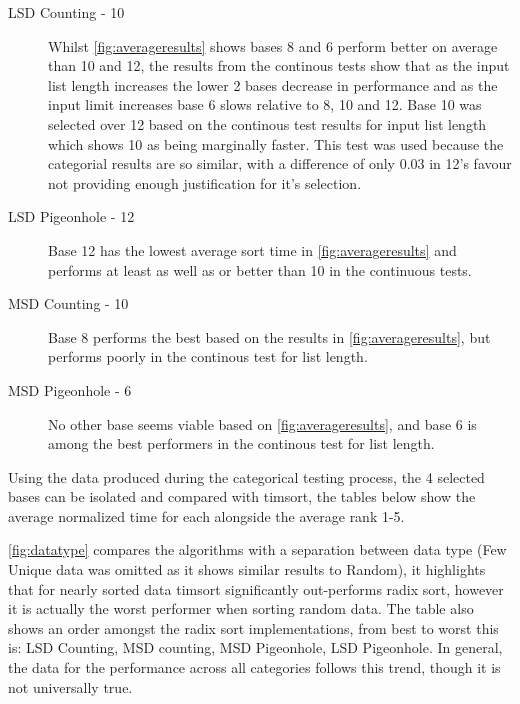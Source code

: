 \documentclass[12pt]{article}
\begin{document}
	\begin{description}
		\item[LSD Counting - 10] Whilst \autoref{fig:averageresults} shows bases 8 and 6 perform better on average than 10 and 12, the results from the continous tests show that as the input list length increases the lower 2 bases decrease in performance and as the input limit increases base 6 slows relative to 8, 10 and 12. Base 10 was selected over 12 based on the continous test results for input list length which shows 10 as being marginally faster. This test was used because the categorial results are so similar, with a difference of only $0.03$ in 12's favour not providing enough justification for it's selection.
		\item[LSD Pigeonhole - 12] Base 12 has the lowest average sort time in \autoref{fig:averageresults} and performs at least as well as or better than 10 in the continuous tests.
		\item[MSD Counting - 10] Base 8 performs the best based on the results in \autoref{fig:averageresults}, but performs poorly in the continous test for list length.
		\item[MSD Pigeonhole - 6] No other base seems viable based on \autoref{fig:averageresults}, and base 6 is among the best performers in the continous test for list length.
	\end{description}
	\par
	Using the data produced during the categorical testing process, the 4 selected bases can be isolated and compared with timsort, the tables below show the average normalized time for each alongside the average rank 1-5.
	\par
	\autoref{fig:datatype} compares the algorithms with a separation between data type (Few Unique data was omitted as it shows similar results to Random), it highlights that for nearly sorted data timsort significantly out-performs radix sort, however it is actually the worst performer when sorting random data. The table also shows an order amongst the radix sort implementations, from best to worst this is: LSD Counting, MSD counting, MSD Pigeonhole, LSD Pigeonhole. In general, the data for the performance across all categories follows this trend, though it is not universally true.
\end{document}
